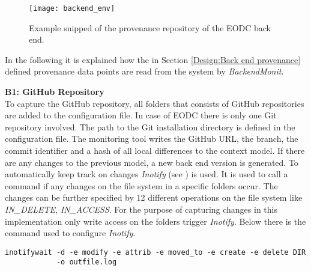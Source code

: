 \documentclass[draft,final]{vutinfth} %
\begin{document}
\begin{figure}[h]
	\centering
	\texttt{[image: backend\_env]}
	\caption{Example snipped of the provenance repository of the EODC back end.}
	\label{fig:backendprovcm} %
\end{figure}

In the following it is explained how the in Section \ref{Design:Back end provenance} defined provenance data points are read from the system by \textit{BackendMonit}.  

\textbf{B1: GitHub Repository} \\
To capture the GitHub repository, all folders that consists of GitHub repositories are added to the configuration file. In case of EODC there is only one Git repository involved. The path to the Git installation directory is defined in the configuration file. The monitoring tool writes the GitHub URL, the branch, the commit identifier and a hash of all local differences to the context model. If there are any changes to the previous model, a new back end version is generated. To automatically keep track on changes \textit{Inotify} (see \cite{inotify}) is used. It is used to call a command if any changes on the file system in a specific folders occur. The changes can be further specified by 12 different operations on the file system like \textit{IN\_DELETE}, \textit{IN\_ACCESS}. For the purpose of capturing changes in this implementation only write access on the folders trigger \textit{Inotify}. Below there is the command used to configure \textit{Inotify}. \\
 
\begin{lstlisting}[frame=single]
inotifywait -d -e modify -e attrib -e moved_to -e create -e delete DIR 
		    -o outfile.log
\end{lstlisting}



\end{document}
